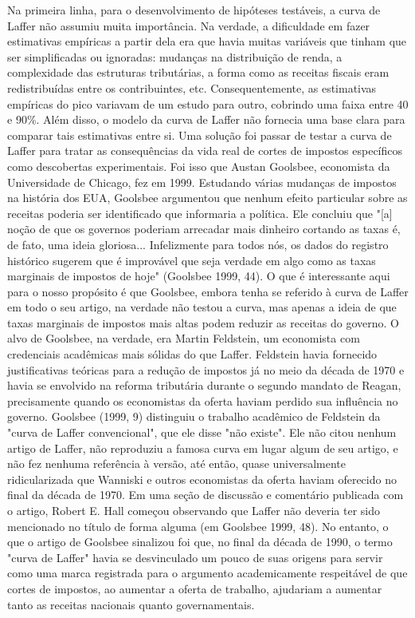 \documentclass[12pt]{article}
\begin{document}
Na primeira linha, para o desenvolvimento de hipóteses testáveis, a curva de Laffer não assumiu muita importância. Na verdade, a dificuldade em fazer estimativas empíricas a partir dela era que havia muitas variáveis que tinham que ser simplificadas ou ignoradas: mudanças na distribuição de renda, a complexidade das estruturas tributárias, a forma como as receitas fiscais eram redistribuídas entre os contribuintes, etc. Consequentemente, as estimativas empíricas do pico variavam de um estudo para outro, cobrindo uma faixa entre 40 e 90\%. Além disso, o modelo da curva de Laffer não fornecia uma base clara para comparar tais estimativas entre si. Uma solução foi passar de testar a curva de Laffer para tratar as consequências da vida real de cortes de impostos específicos como descobertas experimentais. Foi isso que Austan Goolsbee, economista da Universidade de Chicago, fez em 1999. Estudando várias mudanças de impostos na história dos EUA, Goolsbee argumentou que nenhum efeito particular sobre as receitas poderia ser identificado que informaria a política. Ele concluiu que "[a] noção de que os governos poderiam arrecadar mais dinheiro cortando as taxas é, de fato, uma ideia gloriosa... Infelizmente para todos nós, os dados do registro histórico sugerem que é improvável que seja verdade em algo como as taxas marginais de impostos de hoje" (Goolsbee 1999, 44). O que é interessante aqui para o nosso propósito é que Goolsbee, embora tenha se referido à curva de Laffer em todo o seu artigo, na verdade não testou a curva, mas apenas a ideia de que taxas marginais de impostos mais altas podem reduzir as receitas do governo. O alvo de Goolsbee, na verdade, era Martin Feldstein, um economista com credenciais acadêmicas mais sólidas do que Laffer. Feldstein havia fornecido justificativas teóricas para a redução de impostos já no meio da década de 1970 e havia se envolvido na reforma tributária durante o segundo mandato de Reagan, precisamente quando os economistas da oferta haviam perdido sua influência no governo. Goolsbee (1999, 9) distinguiu o trabalho acadêmico de Feldstein da "curva de Laffer convencional", que ele disse "não existe". Ele não citou nenhum artigo de Laffer, não reproduziu a famosa curva em lugar algum de seu artigo, e não fez nenhuma referência à versão, até então, quase universalmente ridicularizada que Wanniski e outros economistas da oferta haviam oferecido no final da década de 1970. Em uma seção de discussão e comentário publicada com o artigo, Robert E. Hall começou observando que Laffer não deveria ter sido mencionado no título de forma alguma (em Goolsbee 1999, 48). No entanto, o que o artigo de Goolsbee sinalizou foi que, no final da década de 1990, o termo "curva de Laffer" havia se desvinculado um pouco de suas origens para servir como uma marca registrada para o argumento academicamente respeitável de que cortes de impostos, ao aumentar a oferta de trabalho, ajudariam a aumentar tanto as receitas nacionais quanto governamentais.
\end{document}
